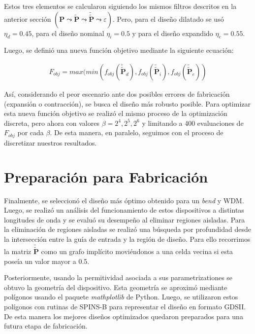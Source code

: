 Estos tres elementos se calcularon siguiendo los mismos filtros descritos en la anterior sección
$(\boldsymbol{P} \mathrel{\leadsto} \widetilde{\boldsymbol{P}} \mathrel{\leadsto}
\widetilde{\widetilde{\boldsymbol{P}}} \mathrel{\leadsto} \varepsilon)$.
Pero, para el diseño dilatado se usó $\eta_d = 0.45$, para el diseño nominal $\eta_i = 0.5$ y
para el diseño expandido $\eta_e = 0.55$.

Luego, se definió una nueva función objetivo mediante la siguiente ecuación:

\begin{equation}
  \begin{split}
    F_{obj} = max(min(
    f_{obj}(\widetilde{\widetilde{\boldsymbol{P}}}_{d}),
    f_{obj}(\widetilde{\widetilde{\boldsymbol{P}}}_{i}),
    f_{obj}(\widetilde{\widetilde{\boldsymbol{P}}}_{e})
    )
  \end{split}
  \label{eq:final-fom}
\end{equation}

Así, considerando el peor escenario ante dos posibles errores de fabricación (expansión o contracción),
se busca el diseño más robusto posible.
Para optimizar esta nueva función objetivo se realizó el mismo proceso de la optimización discreta, pero ahora
con valores $\beta = 2^4, 2^5, 2^6$ y limitando a 400 evaluaciones de $F_{obj}$ por cada $\beta$. 
De esta manera, en paralelo, seguimos con el proceso de discretizar
nuestros resultados.

\section{Preparación para Fabricación}

Finalmente, se seleccionó el diseño más óptimo obtenido para un \emph{bend} y WDM.
Luego, se realizó un análisis del funcionamiento de estos dispositivos a distintas longitudes de onda
y se evaluó su desempeño al eliminar regiones aisladas.
Para la eliminación de regiones aisladas se realizó una búsqueda por profundidad
desde la intersección entre la guía de entrada y la región de diseño.
Para ello recorrimos la matriz $\widetilde{\widetilde{\boldsymbol{P}}}$ como un grafo implícito moviéndonos a una celda
vecina si esta poseía un valor mayor a 0.5.

Posteriormente, usando la permitividad asociada a sus parametrizationes se obtuvo la geometría del dispositivo.
Esta geometría se aproximó mediante polígonos usando el paquete \emph{mathplotlib} de Python.
Luego, se utilizaron estos polígonos con rutinas de SPINS-B
para representar el diseño en formato GDSII.
De esta manera los mejores diseños optimizados quedaron preparados para una 
futura etapa de fabricación.

